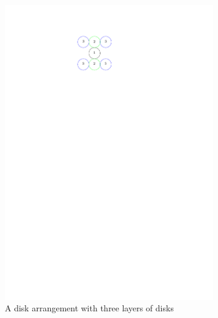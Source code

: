 \begin{figure}[h]
\begin{center}
\begin{subfigure}[b]{0.24\textwidth}
	  \includegraphics[width=\textwidth]{graphics/degree3arrangement.pdf}
	  \caption{A disk arrangement with three layers of disks}
	  \label{fig:circlePacking1-2}
  \end{subfigure}
  \begin{subfigure}[b]{0.24\textwidth}

\end{subfigure}
\end{center}
\end{figure}

